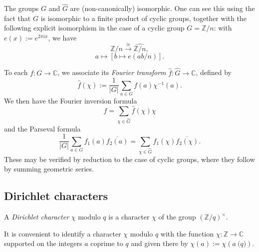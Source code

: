 \documentclass[reqno]{amsart}  \numberwithin{theorem}{section} \numberwithin{equation}{section}
\begin{document}
The groups $G$ and $\hat{G}$ are (non-canonically) isomorphic.  One can see this using the fact that $G$ is isomorphic to a finite product of cyclic groups, together with the following explicit isomorphism in the case of a cyclic group $G = \mathbb{Z} / n$: with $e(x) := e^{2 \pi i x}$, we have
\begin{equation*}
  \mathbb{Z} / n \xrightarrow{\cong } \widehat{\mathbb{Z} / n},
\end{equation*}
\begin{equation*}
  a \mapsto [b \mapsto e (a b / n)].
\end{equation*}

To each $f : G \rightarrow \mathbb{C}$, we associate its \emph{Fourier transform} $\hat{f} : \hat{G} \rightarrow \mathbb{C}$, defined by
\begin{equation*}
  \hat{f}(\chi) := \frac{1}{\lvert G \rvert} \sum_{a \in G} f(a) \chi^{-1}(a).
\end{equation*}
We then have the Fourier inversion formula
\begin{equation*}
  f = \sum_{\chi \in \hat{G}} \hat{f} (\chi) \chi 
\end{equation*}
and the Parseval formula
\begin{equation*}
  \frac{1}{\lvert G \rvert }
  \sum_{a \in G} f_1(a) \overline{f_2(a)}
  = \sum_{\chi \in \hat{G}}
  f_1 (\chi) \overline{f_2 (\chi) }.
\end{equation*}
These may be verified by reduction to the case of cyclic groups, where they follow by summing geometric series.

\subsection{Dirichlet characters}\label{sec:cj57ckezgl}
A \emph{Dirichlet character} $\chi$ modulo $q$ is a character $\chi$ of the group $(\mathbb{Z} / q)^\times $.

It is convenient to identify a character $\chi$ modulo $q$ with the function $\chi : \mathbb{Z} \rightarrow \mathbb{C}$ supported on the integers $a$ coprime to $q$ and given there by $\chi(a) := \chi(a \pod{q})$.
\end{document}
